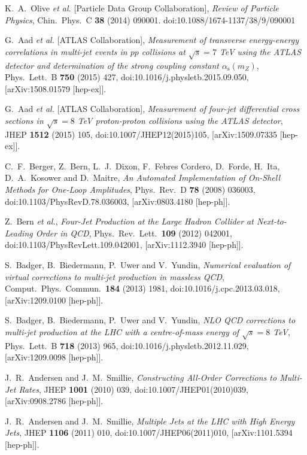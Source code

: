 \documentclass{PoS}
\begin{document}
\begin{thebibliography}{99}
  K.~A.~Olive {\it et al.} [Particle Data Group Collaboration],
  {\it Review of Particle Physics},
  Chin.\ Phys.\ C {\bf 38} (2014) 090001.
  doi:10.1088/1674-1137/38/9/090001

  G.~Aad {\it et al.} [ATLAS Collaboration],
  {\it Measurement of transverse energy-energy correlations in multi-jet events in $pp$ collisions at $\sqrt{s} = 7$ TeV using the ATLAS detector and determination of the strong coupling constant $\alpha_{\mathrm{s}}(m_Z)$},
  Phys.\ Lett.\ B {\bf 750} (2015) 427,
  doi:10.1016/j.physletb.2015.09.050,
  [arXiv:1508.01579 [hep-ex]]. 

  G.~Aad {\it et al.} [ATLAS Collaboration],
  {\it Measurement of four-jet differential cross sections in $\sqrt{s}=8$ TeV proton-proton collisions using the ATLAS detector},
  JHEP {\bf 1512} (2015) 105,
  doi:10.1007/JHEP12(2015)105,
  [arXiv:1509.07335 [hep-ex]].

  C.~F.~Berger, Z.~Bern, L.~J.~Dixon, F.~Febres Cordero, D.~Forde, H.~Ita, D.~A.~Kosower and D.~Maitre,
  {\it An Automated Implementation of On-Shell Methods for One-Loop Amplitudes},
  Phys.\ Rev.\ D {\bf 78} (2008) 036003,
  doi:10.1103/PhysRevD.78.036003,
  [arXiv:0803.4180 [hep-ph]].

  Z.~Bern {\it et al.},
  {\it Four-Jet Production at the Large Hadron Collider at Next-to-Leading Order in QCD},
  Phys.\ Rev.\ Lett.\  {\bf 109} (2012) 042001,
  doi:10.1103/PhysRevLett.109.042001,
  [arXiv:1112.3940 [hep-ph]].

  S.~Badger, B.~Biedermann, P.~Uwer and V.~Yundin,
  {\it Numerical evaluation of virtual corrections to multi-jet production in massless QCD},
  Comput.\ Phys.\ Commun.\  {\bf 184} (2013) 1981,
  doi:10.1016/j.cpc.2013.03.018,
  [arXiv:1209.0100 [hep-ph]].

  S.~Badger, B.~Biedermann, P.~Uwer and V.~Yundin,
  {\it NLO QCD corrections to multi-jet production at the LHC with a centre-of-mass energy of $\sqrt{s}=8$ TeV},
  Phys.\ Lett.\ B {\bf 718} (2013) 965,
  doi:10.1016/j.physletb.2012.11.029,
  [arXiv:1209.0098 [hep-ph]].

  J.~R.~Andersen and J.~M.~Smillie,
  {\it Constructing All-Order Corrections to Multi-Jet Rates},
  JHEP {\bf 1001} (2010) 039,
  doi:10.1007/JHEP01(2010)039,
  [arXiv:0908.2786 [hep-ph]].

  J.~R.~Andersen and J.~M.~Smillie,
  {\it Multiple Jets at the LHC with High Energy Jets},
  JHEP {\bf 1106} (2011) 010,
  doi:10.1007/JHEP06(2011)010,
  [arXiv:1101.5394 [hep-ph]].


\end{thebibliography}
\end{document}
